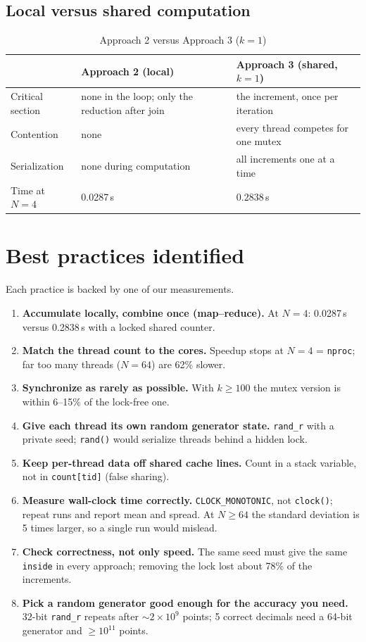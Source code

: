 \documentclass[11pt,a4paper]{article}
\newcommand{\code}[1]{\texttt{#1}}
\begin{document}
\subsection{Local versus shared computation}
\begin{table}[H]
\centering
\caption{Approach 2 versus Approach 3 ($k=1$)}
\begin{tabularx}{\textwidth}{l|X|X}
\toprule
 & Approach 2 (local) & Approach 3 (shared, $k=1$) \\
\midrule
Critical section & none in the loop; only the reduction after join & the increment, once per iteration \\
Contention & none & every thread competes for one mutex \\
Serialization & none during computation & all increments one at a time \\
Time at $N=4$ & 0.0287\,s & 0.2838\,s \\
\bottomrule
\end{tabularx}
\end{table}

\section{Best practices identified}
Each practice is backed by one of our measurements.
\begin{enumerate}[nosep]
  \item \textbf{Accumulate locally, combine once (map--reduce).} At $N=4$: 0.0287\,s versus 0.2838\,s with a locked shared counter.
  \item \textbf{Match the thread count to the cores.} Speedup stops at $N=4$ = \code{nproc}; far too many threads ($N=64$) are 62\% slower.
  \item \textbf{Synchronize as rarely as possible.} With $k\ge100$ the mutex version is within 6--15\% of the lock-free one.
  \item \textbf{Give each thread its own random generator state.} \code{rand\_r} with a private seed; \code{rand()} would serialize threads behind a hidden lock.
  \item \textbf{Keep per-thread data off shared cache lines.} Count in a stack variable, not in \code{count[tid]} (false sharing).
  \item \textbf{Measure wall-clock time correctly.} \code{CLOCK\_MONOTONIC}, not \code{clock()}; repeat runs and report mean and spread. At $N\ge64$ the standard deviation is 5 times larger, so a single run would mislead.
  \item \textbf{Check correctness, not only speed.} The same seed must give the same \code{inside} in every approach; removing the lock lost about 78\% of the increments.
  \item \textbf{Pick a random generator good enough for the accuracy you need.} 32-bit \code{rand\_r} repeats after $\sim2\times10^9$ points; 5 correct decimals need a 64-bit generator and $\ge10^{11}$ points.
\end{enumerate}
\end{document}
